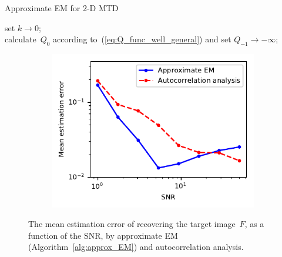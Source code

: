 \documentclass{article}
\begin{document}
\begin{algorithm}[!tb]
  \caption{Approximate EM for \mbox{2-D} MTD}\label{alg:approx_EM}
\BlankLine
set $k \rightarrow 0$;\\
calculate~$Q_{0}$ according to~(\ref{eq:Q_func_well_general}) and set $Q_{-1} \rightarrow -\infty$;\\
\end{algorithm}

\begin{figure}[!tb]
	\begin{subfigure}[ht]{\columnwidth}
		\centering
		\includegraphics[width=0.85\columnwidth]{figures/experiment_SNR_err.pdf}
	\end{subfigure}
	\caption{The mean estimation error of recovering the target image~$F$, as a function of the SNR, by approximate EM (Algorithm~\ref{alg:approx_EM}) and autocorrelation analysis.}
\label{fig:noise_experiment}
\end{figure}
\end{document}
